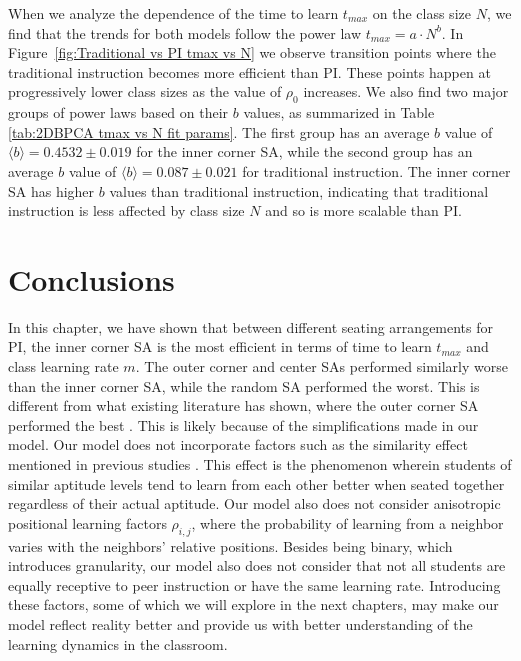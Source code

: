 When we analyze the dependence of the time to learn $t_{max}$ on the class size $N$, we find that the trends for both models follow the power law $t_{max} = a \cdot N^b$. 
In Figure~\ref{fig:Traditional vs PI tmax vs N} we observe transition points where the traditional instruction becomes more efficient than PI. 
These points happen at progressively lower class sizes as the value of $\rho_0$ increases. 
We also find two major groups of power laws based on their $b$ values, as summarized in Table \ref{tab:2DBPCA tmax vs N fit params}. 
The first group has an average $b$ value of $\langle b \rangle = 0.4532 \pm 0.019$ for the inner corner SA, while the second group has an average $b$ value of $\langle b \rangle = 0.087\pm0.021$ for traditional instruction. 
The inner corner SA has higher $b$ values than traditional instruction, indicating that traditional instruction is less affected by class size $N$ and so is more scalable than PI.

\section{Conclusions}
In this chapter, we have shown that between different seating arrangements for PI, the inner corner SA is the most efficient in terms of time to learn $t_{max}$ and class learning rate $m$. 
The outer corner and center SAs performed similarly worse than the inner corner SA, while the random SA performed the worst. 
This is different from what existing literature has shown, where the outer corner SA performed the best \cite{roxas2010seating}. 
This is likely because of the simplifications made in our model. 
Our model does not incorporate factors such as the similarity effect mentioned in previous studies \cite{roxas2010seating,smith2009peer}. 
This effect is the phenomenon wherein students of similar aptitude levels tend to learn from each other better when seated together regardless of their actual aptitude. 
Our model also does not consider anisotropic positional learning factors $\rho_{i,j}$, where the probability of learning from a neighbor varies with the neighbors' relative positions. 
Besides being binary, which introduces granularity, our model also does not consider that not all students are equally receptive to peer instruction or have the same learning rate. 
Introducing these factors, some of which we will explore in the next chapters, may make our model reflect reality better and provide us with better understanding of the learning dynamics in the classroom.


